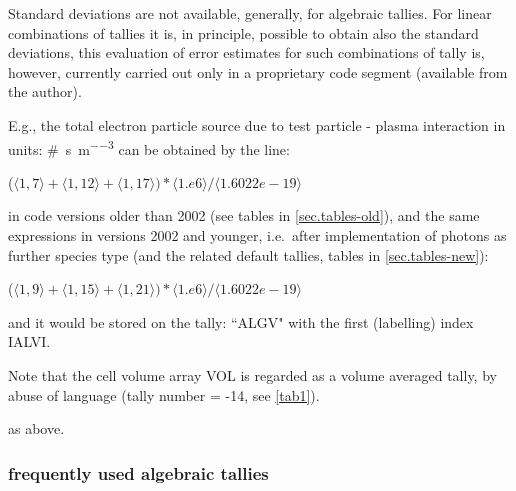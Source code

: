 \begin{description}
        Standard deviations are not available, generally, for algebraic tallies.
        For linear combinations of tallies it is, in principle, possible to obtain also
        the standard deviations, this evaluation of error estimates for such
        combinations of tally is, however, currently  carried out only in a
        proprietary code segment (available from the author).

        E.g., the total electron particle source due to test particle - plasma
        interaction in units: \si{\#\per\second\per\cubic\metre} can be obtained by the
        line:

        ($\langle 1,7\rangle +\langle 1,12\rangle +\langle 1,17\rangle) * \langle
          1.e6\rangle /\langle 1.6022e-19\rangle$

        in code versions older than 2002 (see tables in \cref{sec.tables-old}), and the
        same expressions in versions 2002 and younger, i.e.\ after implementation of
        photons as further species type (and the related default tallies, tables in
        \cref{sec.tables-new}):

        ($\langle 1,9\rangle+\langle 1,15\rangle+\langle 1,21\rangle) * \langle
          1.e6\rangle/\langle 1.6022e-19\rangle$

        and it would be stored on the tally: ``ALGV" with the first (labelling) index
        IALVI.

        Note that the cell volume array VOL is regarded as a volume averaged tally, by
        abuse of language (tally number = -14, see \cref{tab1}).
  \item[TXTTAL, TXTSPC, TXTUNT] as above.
\end{description}

\subsubsection{frequently used algebraic tallies}

